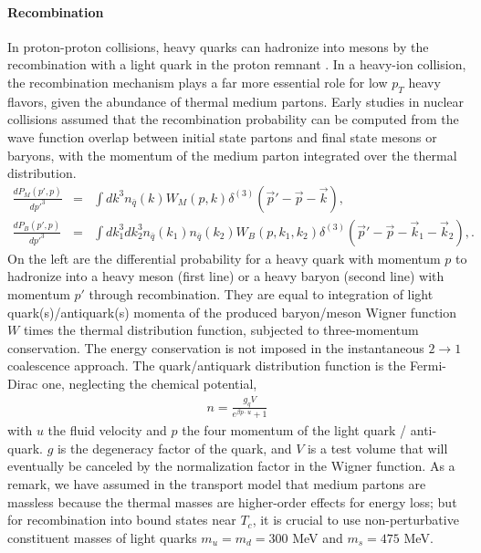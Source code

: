 \paragraph{Recombination}
In proton-proton collisions, heavy quarks can hadronize into mesons by the recombination with a light quark in the proton remnant \cite{Mehen:2003rf}.
In a heavy-ion collision, the recombination mechanism plays a far more essential role for low $p_T$ heavy flavors, given the abundance of thermal medium partons.
Early studies in nuclear collisions \cite{Oh:2009zj} assumed that the recombination probability can be computed from the wave function overlap between initial state partons and final state mesons or baryons, with the momentum of the medium parton integrated over the thermal distribution.
\begin{eqnarray}
\frac{dP_M(p', p)}{dp'^3} &=& \int dk^3 n_{\bar{q}}(k) W_{M}(p, k)\delta^{(3)}(\vec{p}'-\vec{p}-\vec{k}), \label{eq:meson_recombine}\\
\frac{dP_B(p', p)}{dp'^3} &=& \int dk_1^3 dk_2^3 n_{\bar{q}}(k_1)  n_{\bar{q}}(k_2) W_{B}(p, k_1, k_2)\delta^{(3)}(\vec{p}'-\vec{p}-\vec{k}_1 - \vec{k}_2), \label{eq:baryon_recombine}.
\end{eqnarray}
On the left are the differential probability for a heavy quark with momentum $p$ to hadronize into a heavy meson (first line) or a heavy baryon (second line) with momentum $p'$ through recombination.
They are equal to integration of light quark(s)/antiquark(s) momenta of the produced baryon/meson Wigner function $W$ times the thermal distribution function, subjected to three-momentum conservation.
The energy conservation is not imposed in the instantaneous $2\rightarrow 1$ coalescence approach.
The quark/antiquark distribution function is the Fermi-Dirac one, neglecting the chemical potential, 
\begin{eqnarray}
n = \frac{g_q V}{e^{\beta p\cdot u} + 1}
\end{eqnarray}
with $u$ the fluid velocity and $p$ the four momentum of the light quark / anti-quark.
$g$ is the degeneracy factor of the quark, and $V$ is a test volume that will eventually be canceled by the normalization factor in the Wigner function.
As a remark, we have assumed in the transport model that medium partons are massless because the thermal masses are higher-order effects for energy loss; but for recombination into bound states near $T_c$, it is crucial to use non-perturbative constituent masses of light quarks $m_u = m_d = 300$ MeV and $m_s = 475$ MeV.

